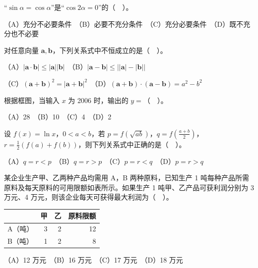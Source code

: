 \begin{question}

“$\sin\alpha=\cos\alpha$”是“$\cos2\alpha=0$”的（　）。

   （A）充分不必要条件　（B）必要不充分条件　（C）充分必要条件　（D）既不充分也不必要

\end{question}
\begin{question}

对任意向量 $\boldsymbol a,\boldsymbol b$，下列关系式中不恒成立的是（　）。

   （A）$|\boldsymbol a\cdot\boldsymbol b|\leq|\boldsymbol a||\boldsymbol b|$　（B）$|\boldsymbol a-\boldsymbol b|\leq\bigl||\boldsymbol a|-|\boldsymbol b|\bigr|$

   （C）$(\boldsymbol a+\boldsymbol b)^2=|\boldsymbol a+\boldsymbol b|^2$　（D）$(\boldsymbol a+\boldsymbol b)\cdot(\boldsymbol a-\boldsymbol b)=a^2-b^2$

\Needspace{0.4\textheight}
\end{question}
\begin{question}

根据框图，当输入 $x$ 为 2006 时，输出的 $y=$（　）。
\nopagebreak[4]
\begin{center}\end{center}
\nopagebreak[4]
   （A）28　（B）10　（C）4　（D）2

\end{question}
\begin{question}

设 $f(x)=\ln x$，$0<a<b$，若 $p=f(\sqrt{ab})$，$q=f(\frac{a+b}{2})$，$r=\frac12(f(a)+f(b))$，则下列关系式中正确的是（　）。

   （A）$q=r<p$　（B）$q=r>p$　（C）$p=r<q$　（D）$p=r>q$

\end{question}
\begin{question}

某企业生产甲、乙两种产品均需用 A，B 两种原料，已知生产 1 吨每种产品所需原料及每天原料的可用限额如表所示。如果生产 1 吨甲、乙产品可获利润分别为 3 万元、4 万元，则该企业每天可获得最大利润为（　）。

\begin{center}
\begin{tabular}{lrrr}
\toprule
 & 甲 & 乙 & 原料限额 \\
\midrule
A（吨） & 3 & 2 & 12 \\
B（吨） & 1 & 2 & 8 \\
\bottomrule
\end{tabular}
\end{center}

    （A）12 万元　（B）16 万元　（C）17 万元　（D）18 万元

\end{question}
